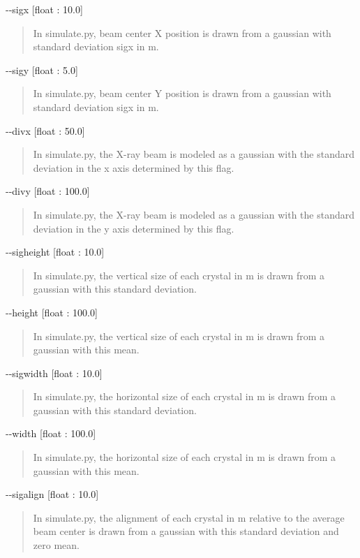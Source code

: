 \documentclass{report}
\begin{document}
\noindent
-{}-sigx [float : 10.0]
\begin{quote}
    In simulate.py, beam center X position is drawn from a gaussian with standard deviation sigx in \textmu m. 
\end{quote}

\noindent
-{}-sigy [float : 5.0]
\begin{quote}
    In simulate.py, beam center Y position is drawn from a gaussian with standard deviation sigx in \textmu m. 
\end{quote}


\noindent
-{}-divx [float : 50.0]
\begin{quote}
    In simulate.py, the X-ray beam is modeled as a gaussian with the standard deviation in the x axis determined by this flag.
\end{quote}

\noindent
-{}-divy [float : 100.0]
\begin{quote}
    In simulate.py, the X-ray beam is modeled as a gaussian with the standard deviation in the y axis determined by this flag.
\end{quote}

\noindent
-{}-sigheight [float : 10.0]
\begin{quote}
    In simulate.py, the vertical size of each crystal in \textmu m is drawn from a gaussian with this standard deviation.
\end{quote}

\noindent
-{}-height [float : 100.0]
\begin{quote}
    In simulate.py, the vertical size of each crystal in \textmu m is drawn from a gaussian with this mean. 
\end{quote}

\noindent
-{}-sigwidth [float : 10.0]
\begin{quote}
    In simulate.py, the horizontal size of each crystal in \textmu m is drawn from a gaussian with this standard deviation.
\end{quote}

\noindent
-{}-width [float : 100.0]
\begin{quote}
    In simulate.py, the horizontal size of each crystal in \textmu m is drawn from a gaussian with this mean. 
\end{quote}

\noindent
-{}-sigalign [float : 10.0]
\begin{quote}
    In simulate.py, the alignment of each crystal in \textmu m relative to the average beam center is drawn from a gaussian with this standard deviation and zero mean.
\end{quote}




\end{document}
